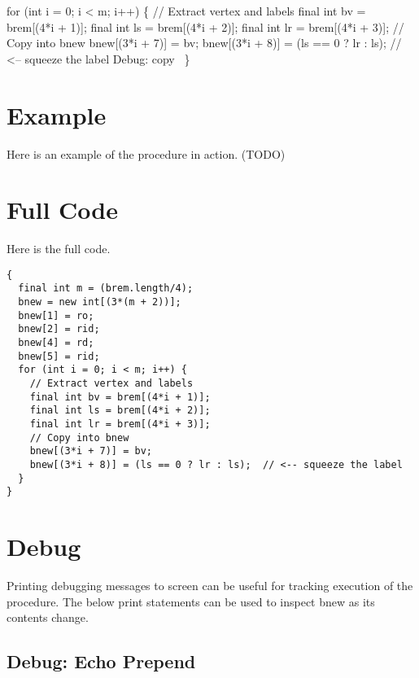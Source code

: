\nwenddocs{}\endmoddef\nwstartdeflinemarkup{}\nwenddeflinemarkup
for (int i = 0; i < m; i++) \{
  // Extract vertex and labels
  final int bv = brem[(4*i + 1)];
  final int ls = brem[(4*i + 2)];
  final int lr = brem[(4*i + 3)];
  // Copy into bnew
  bnew[(3*i + 7)] = bv;
  bnew[(3*i + 8)] = (ls == 0 ? lr : ls);  // <-- squeeze the label
  \LA{}Debug: copy~{\nwtagstyle{}}\RA{}
\}
\nwendcode{}\nwdocspar

\section{Example}

Here is an example of the procedure in action. (TODO)

\section{Full Code}

Here is the full code.

\begin{verbatim}
{
  final int m = (brem.length/4);
  bnew = new int[(3*(m + 2))];
  bnew[1] = ro;
  bnew[2] = rid;
  bnew[4] = rd;
  bnew[5] = rid;
  for (int i = 0; i < m; i++) {
    // Extract vertex and labels
    final int bv = brem[(4*i + 1)];
    final int ls = brem[(4*i + 2)];
    final int lr = brem[(4*i + 3)];
    // Copy into bnew
    bnew[(3*i + 7)] = bv;
    bnew[(3*i + 8)] = (ls == 0 ? lr : ls);  // <-- squeeze the label
  }
}
\end{verbatim}

\section{Debug}

Printing debugging messages to screen can be useful for tracking execution of
the procedure. The below print statements can be used to inspect {\Tt{}bnew\nwendquote} as
its contents change.

\subsection{Debug: Echo Prepend}


